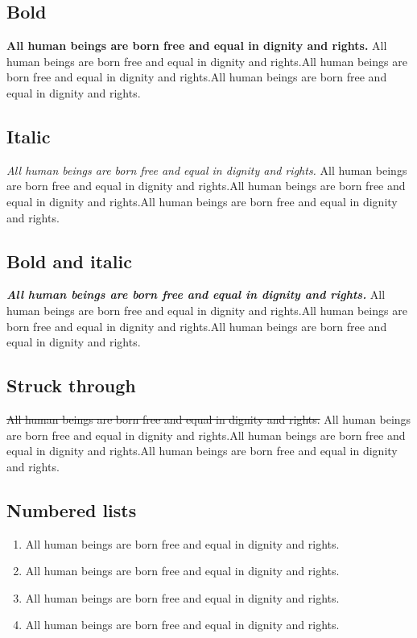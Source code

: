 \documentclass[
]{beamer}
\providecommand{\tightlist}{%
  \setlength{\itemsep}{0pt}\setlength{\parskip}{0pt}}
\begin{document}
\hypertarget{bold}{%
\subsection{Bold}\label{bold}}

\textbf{All human beings are born free and equal in dignity and rights.}
All human beings are born free and equal in dignity and rights.All human
beings are born free and equal in dignity and rights.All human beings
are born free and equal in dignity and rights.

\hypertarget{italic}{%
\subsection{Italic}\label{italic}}

\emph{All human beings are born free and equal in dignity and rights.}
All human beings are born free and equal in dignity and rights.All human
beings are born free and equal in dignity and rights.All human beings
are born free and equal in dignity and rights.

\hypertarget{bold-and-italic}{%
\subsection{Bold and italic}\label{bold-and-italic}}

\textbf{\emph{All human beings are born free and equal in dignity and
rights.}} All human beings are born free and equal in dignity and
rights.All human beings are born free and equal in dignity and
rights.All human beings are born free and equal in dignity and rights.

\hypertarget{struck-through}{%
\subsection{Struck through}\label{struck-through}}

\sout{All human beings are born free and equal in dignity and rights.}
All human beings are born free and equal in dignity and rights.All human
beings are born free and equal in dignity and rights.All human beings
are born free and equal in dignity and rights.

\hypertarget{numbered-lists}{%
\subsection{Numbered lists}\label{numbered-lists}}

\begin{enumerate}
\def\labelenumi{\arabic{enumi}.}
\tightlist
\item
  All human beings are born free and equal in dignity and rights.
\item
  All human beings are born free and equal in dignity and rights.
\item
  All human beings are born free and equal in dignity and rights.
\item
  All human beings are born free and equal in dignity and rights.
\end{enumerate}
\end{document}
